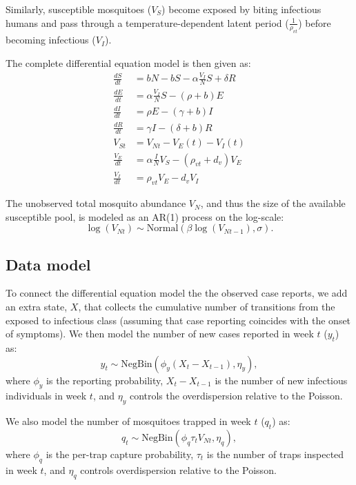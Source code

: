 \documentclass[10pt,letterpaper]{article}
\begin{document}
Similarly, susceptible mosquitoes ($V_S$) become exposed by biting infectious humans and pass through a temperature-dependent latent period ($\frac{1}{\rho_{vt}}$) before becoming infectious ($V_I$).

The complete differential equation model is then given as:
\begin{align} 
\frac{dS}{dt} &= bN - bS - \alpha \frac{V_{I}}{N} S + \delta R\\
\frac{dE}{dt} &= \alpha \frac{V_{I}}{N} S - (\rho + b)E\\
\frac{dI}{dt} &= \rho E - (\gamma + b)I\\
\frac{dR}{dt} &= \gamma I - (\delta + b)R\\
V_{St} & = V_{Nt} - V_E(t) - V_I(t)\\
\frac{V_E}{dt} &= \alpha \frac{I}{N} V_S - (\rho_{vt} + d_v)V_E\\
\frac{V_I}{dt} &= \rho_{vt} V_E - d_v V_I
\end{align}

The unobserved total mosquito abundance $V_N$, and thus the size of the available susceptible pool, is modeled as an AR(1) process on the log-scale:
\begin{equation}
\log(V_{Nt}) \sim \text{Normal}(\beta \log(V_{Nt-1}), \sigma).
\end{equation}

\subsection*{Data model}

To connect the differential equation model the the observed case reports, we add an extra state, $X$, that collects the cumulative number of transitions from the exposed to infectious class (assuming that case reporting coincides with the onset of symptoms).
We then model the number of new cases reported in week $t$ ($y_t$) as:
\begin{equation}
y_t  \sim \text{NegBin}(\phi_y (X_t - X_{t-1}), \eta_y),
\end{equation}
where $\phi_y$ is the reporting probability, $X_t - X_{t-1}$ is the number of new infectious individuals in week $t$, and $\eta_y$ controls the overdispersion relative to the Poisson.

We also model the number of mosquitoes trapped in week $t$ ($q_t$) as:
\begin{equation}
q_t \sim \text{NegBin}(\phi_q \tau_t V_{Nt}, \eta_q),
\end{equation}
where $\phi_q$ is the per-trap capture probability, $\tau_t$ is the number of traps inspected in week $t$, and $\eta_q$ controls overdispersion relative to the Poisson.
\end{document}
